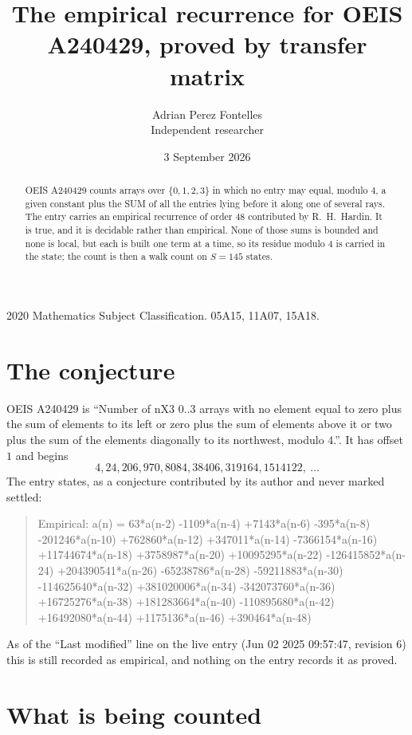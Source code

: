 \documentclass[11pt,a4paper]{article}
\title{The empirical recurrence for OEIS A240429, proved by transfer matrix}
\author{Adrian Perez Fontelles\\ \small Independent researcher}
\date{3 September 2026}
\theoremstyle{plain}
\theoremstyle{definition}
\begin{document}
\maketitle

\begin{abstract}
OEIS A240429 counts arrays over $\{0,1,2,3\}$ in which no entry may equal, modulo $4$, a given
constant plus the SUM of all the entries lying before it along one of several rays. The entry
carries an empirical recurrence of order $48$ contributed by R.~H.~Hardin. It is true, and
it is decidable rather than empirical. None of those sums is bounded and none is local, but
each is built one term at a time, so its residue modulo $4$ is carried in the state; the
count is then a walk count on $S=145$ states.
\end{abstract}

\noindent\small 2020 Mathematics Subject Classification. 05A15, 11A07, 15A18.\normalsize

\section{The conjecture}

OEIS A240429 is ``Number of nX3 0..3 arrays with no element equal to zero plus the sum of elements to its left or zero plus the sum of elements above it or two plus the sum of the elements diagonally to its northwest, modulo 4.''. It has offset $1$ and begins
\[
4, 24, 206, 970, 8084, 38406, 319164, 1514122,\ \dots
\]
The entry states, as a conjecture contributed by its author and never marked settled:
\begin{quote}
Empirical: a(n) = 63*a(n-2) -1109*a(n-4) +7143*a(n-6) -395*a(n-8) -201246*a(n-10) +762860*a(n-12) +347011*a(n-14) -7366154*a(n-16) +11744674*a(n-18) +3758987*a(n-20) +10095295*a(n-22) -126415852*a(n-24) +204390541*a(n-26) -65238786*a(n-28) -59211883*a(n-30) -114625640*a(n-32) +381020006*a(n-34) -342073760*a(n-36) +16725276*a(n-38) +181283664*a(n-40) -110895680*a(n-42) +16492080*a(n-44) +1175136*a(n-46) +390464*a(n-48)
\end{quote}
As of the ``Last modified'' line on the live entry (Jun 02 2025 09:57:47, revision 6) this is still
recorded as empirical, and nothing on the entry records it as proved.

\section{What is being counted}
\end{document}
